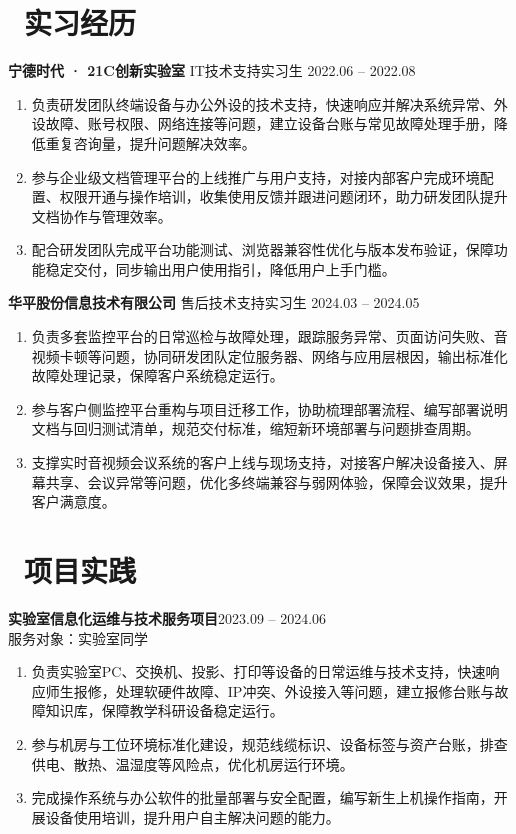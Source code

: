 \documentclass[11pt,a4paper]{ctexart}
\newcommand{\sect}[2]{%
  \section{\texorpdfstring{\makebox[\widthof{\faGraduationCap}][c]{{\mdseries\color{themecolor}#1}}\ #2}{#2}}
}
\begin{document}
\sect{\faBriefcase}{实习经历}
\vspace{4pt}
\noindent\textbf{宁德时代 · 21C创新实验室} \hfill IT技术支持实习生 \hfill 2022.06 -- 2022.08\\
\vspace{-7pt}
\begin{enumerate}[topsep=0pt, partopsep=1pt, itemsep=2pt, parsep=0pt]
  \item 负责研发团队终端设备与办公外设的技术支持，快速响应并解决系统异常、外设故障、账号权限、网络连接等问题，建立设备台账与常见故障处理手册，降低重复咨询量，提升问题解决效率。
  \item 参与企业级文档管理平台的上线推广与用户支持，对接内部客户完成环境配置、权限开通与操作培训，收集使用反馈并跟进问题闭环，助力研发团队提升文档协作与管理效率。
  \item 配合研发团队完成平台功能测试、浏览器兼容性优化与版本发布验证，保障功能稳定交付，同步输出用户使用指引，降低用户上手门槛。
\end{enumerate}
\vspace{4pt}
\noindent\textbf{华平股份信息技术有限公司} \hfill 售后技术支持实习生 \hfill 2024.03 -- 2024.05\\
\vspace{-7pt}
\begin{enumerate}[topsep=0pt, partopsep=1pt, itemsep=2pt, parsep=0pt]
  \item 负责多套监控平台的日常巡检与故障处理，跟踪服务异常、页面访问失败、音视频卡顿等问题，协同研发团队定位服务器、网络与应用层根因，输出标准化故障处理记录，保障客户系统稳定运行。
  \item 参与客户侧监控平台重构与项目迁移工作，协助梳理部署流程、编写部署说明文档与回归测试清单，规范交付标准，缩短新环境部署与问题排查周期。
  \item 支撑实时音视频会议系统的客户上线与现场支持，对接客户解决设备接入、屏幕共享、会议异常等问题，优化多终端兼容与弱网体验，保障会议效果，提升客户满意度。
\end{enumerate}

\sect{\faFileText}{项目实践}

\noindent\textbf{实验室信息化运维与技术服务项目}\hfill 2023.09 -- 2024.06\\
服务对象：实验室同学
\begin{enumerate}[topsep=0pt, partopsep=1pt, itemsep=2pt, parsep=0pt]
  \item 负责实验室PC、交换机、投影、打印等设备的日常运维与技术支持，快速响应师生报修，处理软硬件故障、IP冲突、外设接入等问题，建立报修台账与故障知识库，保障教学科研设备稳定运行。
  \item 参与机房与工位环境标准化建设，规范线缆标识、设备标签与资产台账，排查供电、散热、温湿度等风险点，优化机房运行环境。
  \item 完成操作系统与办公软件的批量部署与安全配置，编写新生上机操作指南，开展设备使用培训，提升用户自主解决问题的能力。
\end{enumerate}
\end{document}
